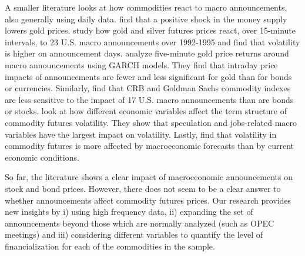 A smaller literature looks at how commodities react to macro announcements, also generally using daily data.  \citet*{frankel1985commodity} find that a positive shock in the money supply lowers gold prices. \citet*{christie2000macroeconomics} study how gold and silver futures prices react, over 15-minute intervals, to 23 U.S. macro announcements over 1992-1995 and find that volatility is higher on announcement days. \citet*{cai2001moves} analyze  five-minute gold price returns around macro announcements using GARCH models. They find that intraday price impacts of announcements are fewer and less significant for gold than for bonds or currencies.  Similarly, \citet*{hess2008commodity} find that CRB and Goldman Sachs commodity indexes are less sensitive to the impact of 17 U.S. macro announcements than are bonds or stocks.  \citet*{hollstein2020volatility} look at how different economic variables affect the term structure of commodity futures volatility. They show that speculation and jobs-related macro variables have the largest impact on volatility. Lastly, \citet*{ye2021macroeconomic}  find that volatility in commodity futures is more affected by macroeconomic forecasts than by current economic conditions. 


So far, the literature shows a clear impact of macroeconomic announcements on stock and bond prices. However, there does not seem to be a clear answer to whether announcements affect commodity futures prices. Our research provides new  insights  by i) using high frequency data, ii) expanding the set of announcements beyond those which are normally analyzed (such as OPEC meetings) and iii) considering different variables to quantify the level of financialization for each of the commodities in the sample.